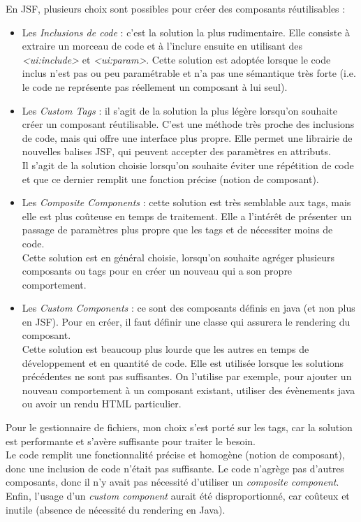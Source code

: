 En JSF, plusieurs choix sont possibles pour créer des composants réutilisables : 
\begin{itemize}
\item Les \textit{Inclusions de code} : c'est la solution la plus rudimentaire. Elle consiste à extraire un morceau de code et à l'inclure ensuite en utilisant des \textit{<ui:include>} et \textit{<ui:param>}. Cette solution est adoptée lorsque le code inclus n'est pas ou peu paramétrable et n'a pas une sémantique très forte (i.e. le code ne représente pas réellement un composant à lui seul).
\item Les \textit{Custom Tags} : il s'agit de la solution la plus légère lorsqu'on souhaite créer un composant réutilisable. C'est une méthode très proche des inclusions de code, mais qui offre une interface plus propre. Elle permet une librairie de nouvelles balises JSF, qui peuvent accepter des paramètres en attributs. \\
Il s'agit de la solution choisie lorsqu'on souhaite éviter une répétition de code et que ce dernier remplit une fonction précise (notion de composant).
\item Les \textit{Composite Components\cite{bib:compositeComponent}} : cette solution est très semblable aux tags, mais elle est plus coûteuse en temps de traitement. Elle a l'intérêt de présenter un passage de paramètres plus propre que les tags et de nécessiter moins de code.\\
Cette solution est en général choisie, lorsqu'on souhaite agréger plusieurs composants ou tags pour en créer un nouveau qui a son propre comportement.
\item Les \textit{Custom Components} : ce sont des composants définis en java (et non plus en JSF). Pour en créer, il faut définir une classe qui assurera le rendering du composant.\\
Cette solution est beaucoup plus lourde que les autres en temps de développement et en quantité de code. Elle est utilisée lorsque les solutions précédentes ne sont pas suffisantes. On l'utilise par exemple, pour ajouter un nouveau comportement à un composant existant, utiliser des évènements java ou avoir un rendu HTML particulier. 
\end{itemize}

Pour le gestionnaire de fichiers, mon choix s'est porté sur les tags, car la solution est performante et s'avère suffisante pour traiter le besoin.\\
Le code remplit une fonctionnalité précise et homogène (notion de composant), donc une inclusion de code n'était pas suffisante. Le code n'agrège pas d'autres composants, donc il n'y avait pas nécessité d'utiliser un \textit{composite component}. Enfin, l'usage d'un \textit{custom component} aurait été disproportionné, car coûteux et inutile (absence de nécessité du rendering en Java).

